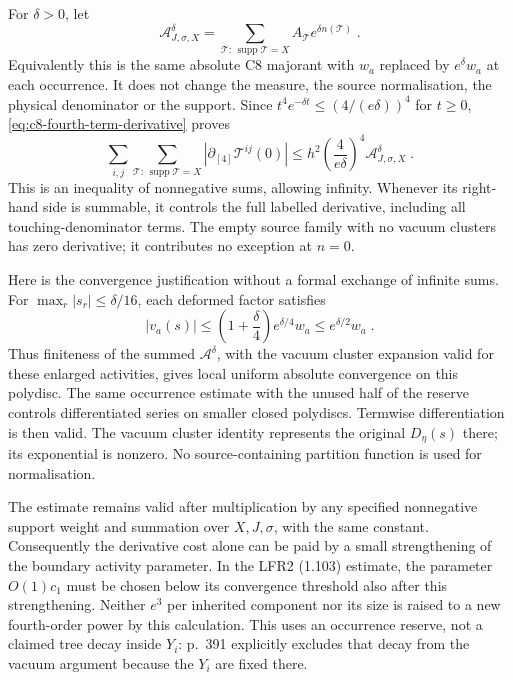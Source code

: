 \documentclass[11pt]{article}
\begin{document}
For $\delta>0$, let
\begin{equation}\label{eq:c8-fourth-boosted-majorant}
    \mathcal A^{\delta}_{J,\sigma,X}
        =\sum_{\mathcal T:\,\operatorname{supp}\mathcal T=X}
            A_{\mathcal T}e^{\delta n(\mathcal T)}\;.
\end{equation}
Equivalently this is the same absolute C8 majorant with $w_a$
replaced by $e^\delta w_a$ at each occurrence. It does not change
the measure, the source normalisation, the physical denominator or
the support. Since $t^4e^{-\delta t}\leq(4/(e\delta))^4$ for
$t\geq0$, \eqref{eq:c8-fourth-term-derivative} proves
\begin{equation}\label{eq:c8-fourth-labelled-bound}
    \sum_{i,j}\sum_{\mathcal T:\,\operatorname{supp}\mathcal T=X}
        |\partial_{[4]}\mathcal T^{ij}(0)|
        \leq h^2\left(\frac{4}{e\delta}\right)^4
            \mathcal A^{\delta}_{J,\sigma,X}\;.
\end{equation}
This is an inequality of nonnegative sums, allowing infinity.
Whenever its right-hand side is summable, it controls the full
labelled derivative, including all touching-denominator terms.
The empty source family with no vacuum clusters has zero derivative;
it contributes no exception at $n=0$.

Here is the convergence justification without a formal exchange of
infinite sums. For $\max_r|s_r|\leq\delta/16$, each deformed factor
satisfies
\begin{equation}\label{eq:c8-fourth-source-polydisc}
    |v_a(s)|\leq
        \left(1+\frac{\delta}{4}\right)
        e^{\delta/4}w_a\leq e^{\delta/2}w_a\;.
\end{equation}
Thus finiteness of the summed $\mathcal A^\delta$, with the vacuum
cluster expansion valid for these enlarged activities, gives local
uniform absolute convergence on this polydisc. The same occurrence
estimate with the unused half of the reserve controls differentiated
series on smaller closed polydiscs. Termwise differentiation is then
valid. The vacuum cluster identity represents the original
$D_\eta(s)$ there; its exponential is nonzero. No source-containing
partition function is used for normalisation.

The estimate remains valid after multiplication by any specified
nonnegative support weight and summation over $X,J,\sigma$, with
the same constant. Consequently the derivative cost alone can be
paid by a small strengthening of the boundary activity parameter.
In the LFR2 (1.103) estimate, the parameter $O(1)c_1$ must be chosen
below its convergence threshold also after this strengthening.
Neither $e^3$ per inherited component nor its size is raised to a
new fourth-order power by this calculation. This uses an occurrence
reserve, not a claimed tree decay inside $Y_i$: p.~391 explicitly
excludes that decay from the vacuum argument because the $Y_i$ are
fixed there.
\end{document}

